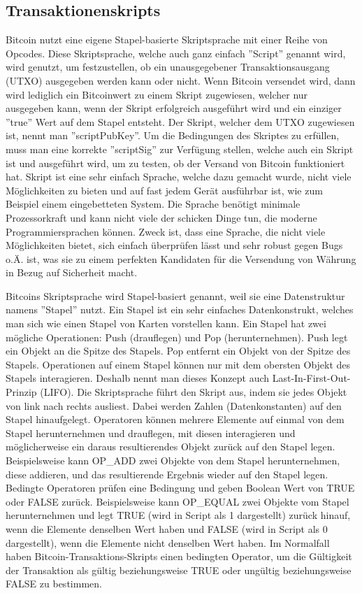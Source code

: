 \subsection{Transaktionenskripts}
Bitcoin nutzt eine eigene Stapel-basierte Skriptsprache mit einer Reihe von Opcodes. Diese Skriptsprache, welche auch ganz 
einfach ''Script'' genannt wird, wird genutzt, um festzustellen, ob ein unausgegebener Transaktionsausgang (UTXO) ausgegeben 
werden kann oder nicht. Wenn Bitcoin versendet wird,
dann wird lediglich ein Bitcoinwert zu einem Skript zugewiesen, welcher nur ausgegeben kann, wenn der Skript erfolgreich
ausgeführt wird und ein einziger ''true'' Wert auf dem Stapel entsteht. Der Skript, welcher dem UTXO zugewiesen ist, nennt man
''scriptPubKey''. Um die Bedingungen des Skriptes zu erfüllen, muss man eine korrekte ''scriptSig'' zur Verfügung stellen,
welche auch ein Skript ist und ausgeführt wird, um zu testen, ob der Versand von Bitcoin funktioniert hat.  
Skript ist eine sehr einfach Sprache, welche dazu gemacht wurde, nicht viele Möglichkeiten zu bieten und auf fast jedem
Gerät ausführbar ist, wie zum Beispiel einem eingebetteten System. Die Sprache benötigt minimale Prozessorkraft und kann nicht 
viele der schicken Dinge tun, die moderne Programmiersprachen können. Zweck ist, dass eine Sprache, die nicht viele Möglichkeiten
bietet, sich einfach überprüfen lässt und sehr robust gegen Bugs o.Ä. ist, was sie zu einem perfekten Kandidaten für die 
Versendung von Währung in Bezug auf Sicherheit macht.

Bitcoins Skriptsprache wird Stapel-basiert genannt, weil sie eine Datenstruktur namens ''Stapel'' nutzt. Ein Stapel ist ein sehr
einfaches Datenkonstrukt, welches man sich wie einen Stapel von Karten vorstellen kann. Ein Stapel hat zwei mögliche Operationen:
Push (drauflegen) und Pop (herunternehmen). Push legt ein Objekt an die Spitze des Stapels. Pop entfernt ein Objekt von der
Spitze des Stapels. Operationen auf einem Stapel können nur mit dem obersten Objekt des Stapels interagieren. Deshalb nennt man
dieses Konzept auch Last-In-First-Out-Prinzip (LIFO). Die Skriptsprache führt den Skript aus, indem sie jedes Objekt von link
nach rechts ausliest. Dabei werden Zahlen (Datenkonstanten) auf den Stapel hinaufgelegt. Operatoren können mehrere Elemente auf
einmal von dem Stapel herunternehmen und drauflegen, mit diesen interagieren und möglicherweise ein daraus resultierendes Objekt
zurück auf den Stapel legen. Beispielsweise kann OP\_ADD zwei Objekte von dem Stapel herunternehmen, diese addieren, und das
resultierende Ergebnis wieder auf den Stapel legen.
Bedingte Operatoren prüfen eine Bedingung und geben Boolean Wert von TRUE oder FALSE zurück. Beispielsweise kann OP\_EQUAL zwei
Objekte vom Stapel herunternehmen und legt TRUE (wird in Script als 1 dargestellt) zurück hinauf, wenn die Elemente denselben
Wert haben und FALSE (wird in Script als 0 dargestellt), wenn die Elemente nicht denselben Wert haben. Im Normalfall haben
Bitcoin-Transaktions-Skripts einen bedingten Operator, um die Gültigkeit der Transaktion als gültig beziehungsweise TRUE oder
ungültig beziehungsweise FALSE zu bestimmen. 

